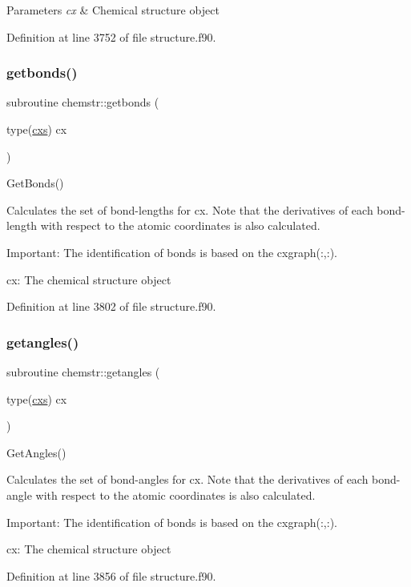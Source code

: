 \begin{DoxyParams}{Parameters}
{\em cx} & Chemical structure object \\
\hline
\end{DoxyParams}


Definition at line 3752 of file structure.\+f90.

\mbox{\label{namespacechemstr_a5f87f4ee909fc5c3c54278aca9df1241}} 
\subsubsection{\texorpdfstring{getbonds()}{getbonds()}}
{\footnotesize\ttfamily subroutine chemstr\+::getbonds (\begin{DoxyParamCaption}\item[{type(\mbox{\hyperlink{structchemstr_1_1cxs}{cxs}})}]{cx }\end{DoxyParamCaption})}



Get\+Bonds() 

Calculates the set of bond-\/lengths for cx. Note that the derivatives of each bond-\/length with respect to the atomic coordinates is also calculated.

Important\+: The identification of bonds is based on the cxgraph(\+:,\+:).


\begin{DoxyItemize}
\item cx\+: The chemical structure object 
\end{DoxyItemize}

Definition at line 3802 of file structure.\+f90.

\mbox{\label{namespacechemstr_acffc073bd33497662f25faf7a2beee56}} 
\subsubsection{\texorpdfstring{getangles()}{getangles()}}
{\footnotesize\ttfamily subroutine chemstr\+::getangles (\begin{DoxyParamCaption}\item[{type(\mbox{\hyperlink{structchemstr_1_1cxs}{cxs}})}]{cx }\end{DoxyParamCaption})}



Get\+Angles() 

Calculates the set of bond-\/angles for cx. Note that the derivatives of each bond-\/angle with respect to the atomic coordinates is also calculated.

Important\+: The identification of bonds is based on the cxgraph(\+:,\+:).


\begin{DoxyItemize}
\item cx\+: The chemical structure object 
\end{DoxyItemize}

Definition at line 3856 of file structure.\+f90.

